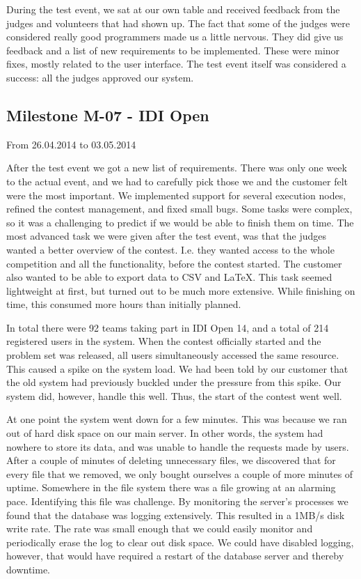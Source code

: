 \pagebreak
During the test event, we sat at our own table and received feedback
from the judges and volunteers that had shown up. The fact that some of
the judges were considered really good programmers made us a little
nervous. They did give us feedback and a list of new requirements to be
implemented. These were minor fixes, mostly related to the user
interface. The test event itself was considered a success: all the
judges approved our system.

\subsection{Milestone M-07 - IDI Open}
\label{sec:M07}
From 26.04.2014 to 03.05.2014

After the test event we got a new list of requirements. There was only
one week to the actual event, and we had to carefully pick those we and
the customer felt were the most important. We implemented support for
several execution nodes, refined the contest management, and fixed small
bugs. Some tasks were complex, so it was a challenging to predict if we
would be able to finish them on time. The most advanced task we were
given after the test event, was that the judges wanted a better overview
of the contest. I.e. they wanted access to the whole
competition and all the functionality, before the contest started. The
customer also wanted to be able to export data to CSV and LaTeX. This
task seemed lightweight at first, but turned out to be much more
extensive. While finishing on time, this consumed more hours than
initially planned.

In total there were 92 teams taking part in IDI Open 14, and a total of
214 registered users in the system. When the contest officially started
and the problem set was released, all users simultaneously accessed
the same resource. This caused a spike on the system load. We had been told
by our customer that the old system had previously buckled under the
pressure from this spike. Our system did, however, handle this well. 
Thus, the start of the contest went well. 

At one point the system went down for a few minutes. This was because we
ran out of hard disk space on our main server. In other words, the
system had nowhere to store its data, and was unable to handle the
requests made by users. After a couple of minutes of deleting
unnecessary files, we discovered that for every file that we removed, we
only bought ourselves a couple of more minutes of uptime. Somewhere in
the file system there was a file growing at an alarming pace. 
Identifying this file was challenge. By monitoring the
server's processes we found that the database was logging extensively. 
This resulted in a 1MB/s disk write rate. The rate was small enough that
we could easily monitor and periodically erase the log to clear out
disk space. We could have disabled logging, however, that would have
required a restart of the database server and thereby downtime. 

